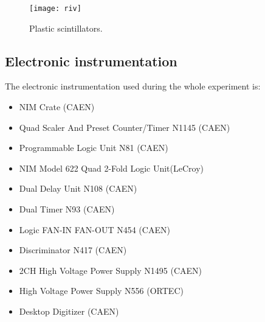 \begin{figure}[!h]
	\centering
	\texttt{[image: riv]}
	\caption{Plastic scintillators.}
	\label{rivelatori}
\end{figure}

\subsection{Electronic instrumentation } \label{Electronic instrumentation}

The electronic instrumentation used during the whole experiment is:
\begin{itemize}
	\item NIM Crate (CAEN)
	\item Quad Scaler And Preset Counter/Timer N1145 (CAEN)
	\item Programmable Logic Unit N81 (CAEN)
	\item NIM Model 622 Quad 2-Fold Logic Unit(LeCroy)
	\item Dual Delay Unit N108 (CAEN)
	\item Dual Timer N93 (CAEN)
	\item Logic FAN-IN FAN-OUT N454 (CAEN)
	\item Discriminator N417 (CAEN)
	\item 2CH High Voltage Power Supply N1495 (CAEN)
	\item High Voltage Power Supply N556 (ORTEC)
	\item Desktop Digitizer (CAEN)
\end{itemize}